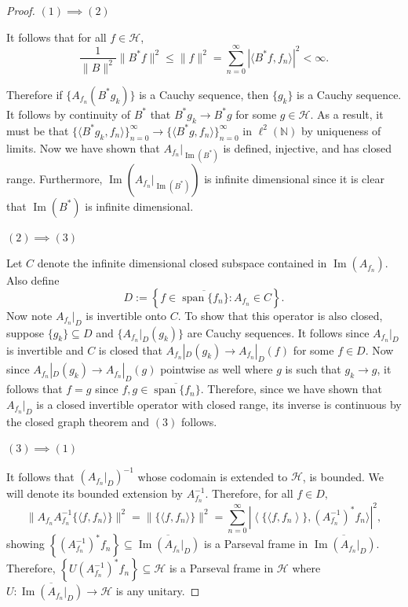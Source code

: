 \documentclass[10pt,a4paper]{amsart}
\newcommand{\Hcal}{\mathcal{H}} %
\begin{document}
\begin{proof}
$(1)\implies (2)$

It follows that for all $f\in \Hcal$,
\begin{equation}\label{analysisopeq}
\frac{1}{\|B\|^{2}} \|B^{*}f\|^{2}\leq \|f \|^{2}=\sum_{n=0}^{\infty}|\langle B^{*}f, f_n\rangle|^{2}<\infty.  
\end{equation}

Therefore if $\{A_{f_n}(B^{*}g_k)\}$ is a Cauchy sequence, then $\{g_k\}$ is a Cauchy sequence. It follows by continuity of $B^{*}$ that $B^{*}g_k\to B^{*}g$ for some $g\in \Hcal$. As a result, it must be that $\{\langle B^{*}g_k, f_n\rangle\}_{n=0}^{\infty}\to \{\langle B^{*}g, f_n\rangle\}_{n=0}^{\infty}$ in $\ell^2(\mathbb{N})$ by uniqueness of limits. Now we have shown that $A_{f_n}|_{\operatorname{Im}(B^*)}$ is defined, injective, and has closed range. Furthermore, $\operatorname{Im}(A_{f_n}|_{\operatorname{Im}(B^*)})$ is infinite dimensional since it is clear that $\operatorname{Im}(B^{*})$ is infinite dimensional.

$(2)\implies (3)$

Let $C$ denote the infinite dimensional closed subspace contained in \newline $\operatorname{Im}(A_{f_n})$. Also define 
$$D:=\left\{f\in \overline{\operatorname{span}\{f_n\}}: A_{f_n}\in C \right\}.$$
Now note $A_{f_n}|_{D}$ is invertible onto $C$. To show that this operator is also closed, suppose $\{g_k\}\subseteq D$ and $\{A_{f_n}|_{D}(g_k)\}$ are Cauchy sequences. It follows since $A_{f_n}|_{D}$ is invertible and $C$ is closed that $A_{f_n}|_{D}(g_k)\to A_{f_n}|_{D}(f)$ for some $f\in D$. Now since $A_{f_n}|_{D}(g_k)\to A_{f_n}|_{D}(g)$ pointwise as well where $g$ is such that
$g_k\to g$, it follows that 
$f=g$ since $f,g\in \overline{\operatorname{span}\{f_n\}}$.
Therefore, since we have shown that $A_{f_n}|_{D}$ is a closed invertible operator with closed range, its inverse is continuous by the closed graph theorem and $(3)$ follows.

$(3)\implies (1)$

It follows that $(A_{f_n}|_{D})^{-1}$ whose codomain is extended to $\Hcal$, is bounded. We will denote its bounded extension by $A_{f_n}^{-1}$. Therefore, for all $f\in D,$
$$\|A_{f_n}A^{-1}_{f_n}\{\langle f, f_n\rangle\}\|^{2}=\|\{\langle f, f_n\rangle\}\|^{2}=\sum_{n=0}^{\infty}|\left\langle \{\langle f, f_n \right\rangle\},(A^{-1}_{f_n})^{*}f_n\rangle|^{2},$$ showing $\left\{(A^{-1}_{f_n})^{*}f_n \right\}\subseteq \overline{\operatorname{Im}(A_{f_n}|_{D})}$ is a Parseval frame in $\overline{\operatorname{Im}(A_{f_n}|_{D})}$. Therefore, $\left\{U(A^{-1}_{f_n})^{*}f_n \right\}\subseteq \Hcal$ is a Parseval frame in $\Hcal$ where $U: \overline{\operatorname{Im}(A_{f_n}|_{D})}\to \Hcal$ is any unitary.


\end{proof}
\end{document}
